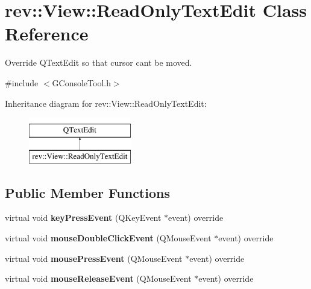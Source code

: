 \hypertarget{classrev_1_1_view_1_1_read_only_text_edit}{}\section{rev\+::View\+::Read\+Only\+Text\+Edit Class Reference}
\label{classrev_1_1_view_1_1_read_only_text_edit}


Override Q\+Text\+Edit so that cursor can\textquotesingle{}t be moved.  




{\ttfamily \#include $<$G\+Console\+Tool.\+h$>$}

Inheritance diagram for rev\+::View\+::Read\+Only\+Text\+Edit\+:\begin{figure}[H]
\begin{center}
\leavevmode
\includegraphics[height=2.000000cm]{classrev_1_1_view_1_1_read_only_text_edit}
\end{center}
\end{figure}
\subsection*{Public Member Functions}
\begin{DoxyCompactItemize}
\item 
\mbox{\label{classrev_1_1_view_1_1_read_only_text_edit_a6e2ca400bc92a3ab168040083eee4e33}} 
virtual void {\bfseries key\+Press\+Event} (Q\+Key\+Event $\ast$event) override
\item 
\mbox{\label{classrev_1_1_view_1_1_read_only_text_edit_a8d09526d5211d8b7042a2d9f01311c1d}} 
virtual void {\bfseries mouse\+Double\+Click\+Event} (Q\+Mouse\+Event $\ast$event) override
\item 
\mbox{\label{classrev_1_1_view_1_1_read_only_text_edit_ae5c98b2890f419b361a11ffbd5a365bd}} 
virtual void {\bfseries mouse\+Press\+Event} (Q\+Mouse\+Event $\ast$event) override
\item 
\mbox{\label{classrev_1_1_view_1_1_read_only_text_edit_a15952ff57f4a6ae6cbe7b6f566853f8a}} 
virtual void {\bfseries mouse\+Release\+Event} (Q\+Mouse\+Event $\ast$event) override
\end{DoxyCompactItemize}


